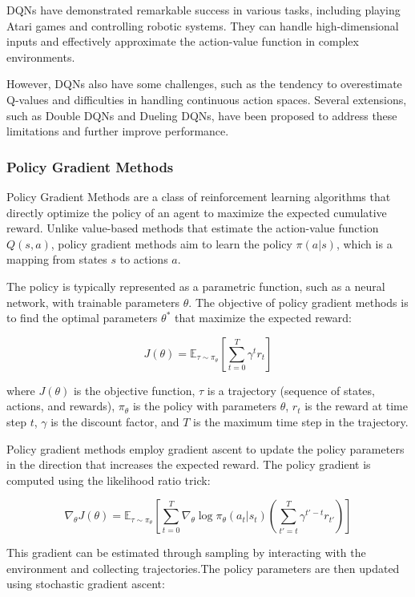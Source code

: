 DQNs have demonstrated remarkable success in various tasks, including playing Atari games and controlling robotic systems. They can handle high-dimensional inputs and effectively approximate the action-value function in complex environments.

However, DQNs also have some challenges, such as the tendency to overestimate Q-values and difficulties in handling continuous action spaces. Several extensions, such as Double DQNs and Dueling DQNs, have been proposed to address these limitations and further improve performance.

\subsubsection{Policy Gradient Methods}
Policy Gradient Methods are a class of reinforcement learning algorithms that directly optimize the policy of an agent to maximize the expected cumulative reward. Unlike value-based methods that estimate the action-value function \(Q(s, a)\), policy gradient methods aim to learn the policy \(\pi(a|s)\), which is a mapping from states \(s\) to actions \(a\).

The policy is typically represented as a parametric function, such as a neural network, with trainable parameters \(\theta\). The objective of policy gradient methods is to find the optimal parameters \(\theta^*\) that maximize the expected reward:

\[J(\theta) = \mathbb{E}_{\tau \sim \pi_{\theta}} \left[ \sum_{t=0}^{T} \gamma^t r_t \right]\]

where \(J(\theta)\) is the objective function, \(\tau\) is a trajectory (sequence of states, actions, and rewards), \(\pi_{\theta}\) is the policy with parameters \(\theta\), \(r_t\) is the reward at time step \(t\), \(\gamma\) is the discount factor, and \(T\) is the maximum time step in the trajectory.

Policy gradient methods employ gradient ascent to update the policy parameters in the direction that increases the expected reward. The policy gradient is computed using the likelihood ratio trick:

\[\nabla_{\theta} J(\theta) = \mathbb{E}_{\tau \sim \pi_{\theta}} \left[ \sum_{t=0}^{T} \nabla_{\theta} \log \pi_{\theta}(a_t|s_t) \left( \sum_{t'=t}^{T} \gamma^{t'-t} r_{t'} \right) \right]\]

This gradient can be estimated through sampling by interacting with the environment and collecting trajectories.The policy parameters are then updated using stochastic gradient ascent:

